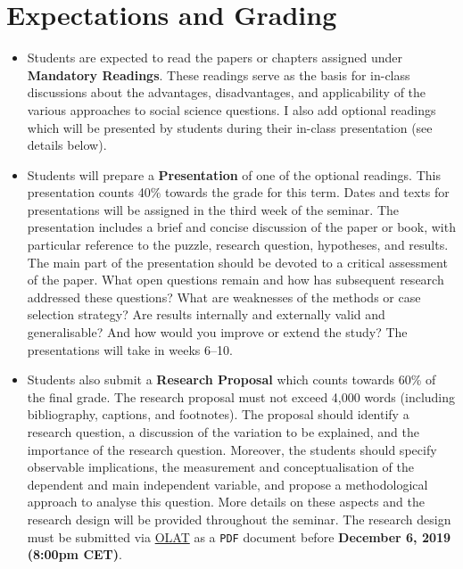 \documentclass[abstract=on,parskip=full,headings=standardclasses,fontsize=11pt,paper=a4]{scrartcl}
\begin{document}
\section*{Expectations and Grading}


\begin{itemize}
\item Students are expected to read the papers or chapters assigned under \textbf{Mandatory Readings}. These readings serve as the basis for in-class discussions about the advantages, disadvantages, and applicability of the various approaches to social science questions. I also add optional readings which will be presented by students during their in-class presentation (see details below). 

\item Students will prepare a  \textbf{Presentation} of one of the optional readings. This presentation counts 40\% towards the grade for this term. Dates and texts for presentations will be assigned in the third week of the seminar. The presentation includes a brief and concise discussion of the paper or book, with particular reference to the puzzle, research question, hypotheses, and results. The main part of the presentation should be devoted to a critical assessment of the paper. What open questions remain and how has subsequent research addressed these questions? What are weaknesses of the methods or case selection strategy? Are results internally and externally valid and generalisable? And how would you improve or extend the study? The presentations will take in weeks 6--10.

\item Students also submit a \textbf{Research Proposal} which counts towards 60\% of the final grade. The research proposal must not exceed 4,000 words  (including bibliography, captions, and footnotes).  The proposal  should identify a  research question, a discussion of the variation to be explained, and the importance of the research question. Moreover, the students should specify observable implications, the measurement and conceptualisation of the dependent and main independent variable, and propose a methodological approach to analyse this question. More details on these aspects and the research design will be provided throughout the seminar. The research design must be submitted via \href{https://lms.uzh.ch}{OLAT} as a \texttt{PDF} document before \textbf{December 6, 2019 (8:00pm CET)}. 
\end{itemize}
\end{document}

